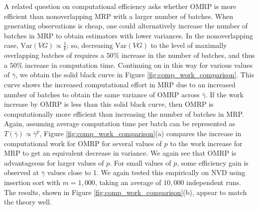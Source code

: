\documentclass[12pt]{article}
\newcommand{\var}[1]{\mathrm{Var} \left( #1 \right)}
\newcommand{\gammab}{\bar{\gamma}}
\begin{document}
A related question on computational efficiency asks whether OMRP is more efficient than nonoverlapping MRP with a larger number of batches.
When generating observations is cheap, one could alternatively increase the number of batches in MRP to obtain estimators with lower variances. 
In the nonoverlapping case, $\var{VG} \propto \frac{1}{k}$; so, decreasing $\var{VG}$ to the level of maximally overlapping batches of \cite{Meketon1984} requires a $50\%$ increase in the number of batches, and thus a $50\%$ increase in computation time.
Continuing on in this way for various values of $\gammab$, we obtain the solid black curve in Figure \ref{fig:comp_work_comparison}. 
This curve shows the increased computational effort in MRP due to an increased number of batches to obtain the same variance of OMRP across $\gammab$.
If the work increase by OMRP is less than this solid black curve, then OMRP is computationally more efficient than increasing the number of batches in MRP. 
Again, assuming average computation time per batch can be represented as $T(\gammab) \propto \gammab^p$, Figure \ref{fig:comp_work_comparison}(a) compares the increase in computational work for OMRP for several values of $p$ to the work increase for MRP to get an equivalent decrease in variance.
We again see that OMRP is advantageous for larger values of $p$.
For small values of $p$, some efficiency gain is observed at $\gammab$ values close to 1.
We again tested this empirically on NVD using insertion sort with $m=1,000$, taking an average of $10,000$ independent runs. 
The results, shown in Figure \ref{fig:comp_work_comparison}(b), appear to match the theory well. 
\end{document}
